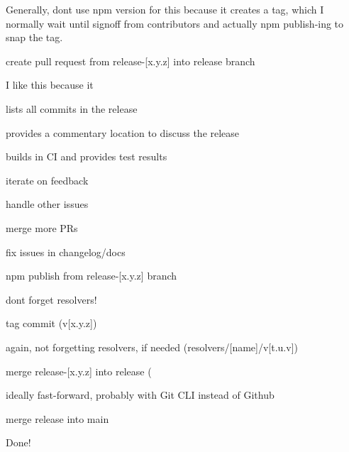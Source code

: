 \begin{DoxyEnumerate}
\begin{DoxyCode}{0}
\end{DoxyCode}


Generally, don\textquotesingle{}t use {\ttfamily npm version} for this because it creates a tag, which I normally wait until signoff from contributors and actually {\ttfamily npm publish}-\/ing to snap the tag.
\item create pull request from {\ttfamily release-\/\mbox{[}x.\+y.\+z\mbox{]}} into {\ttfamily release} branch

I like this because it
\begin{DoxyItemize}
\item lists all commits in the release
\item provides a commentary location to discuss the release
\item builds in CI and provides test results
\end{DoxyItemize}
\item iterate on feedback
\begin{DoxyItemize}
\item handle other issues
\item merge more PRs
\item fix issues in changelog/docs
\end{DoxyItemize}
\item {\ttfamily npm publish} from {\ttfamily release-\/\mbox{[}x.\+y.\+z\mbox{]}} branch
\begin{DoxyItemize}
\item don\textquotesingle{}t forget resolvers!
\end{DoxyItemize}
\item tag commit ({\ttfamily v\mbox{[}x.\+y.\+z\mbox{]}})
\begin{DoxyItemize}
\item again, not forgetting resolvers, if needed ({\ttfamily resolvers/\mbox{[}name\mbox{]}/v\mbox{[}t.\+u.\+v\mbox{]}})
\end{DoxyItemize}
\item merge {\ttfamily release-\/\mbox{[}x.\+y.\+z\mbox{]}} into {\ttfamily release} (
\begin{DoxyItemize}
\item ideally fast-\/forward, probably with Git CLI instead of Github
\end{DoxyItemize}
\item merge {\ttfamily release} into {\ttfamily main}
\end{DoxyEnumerate}

Done! 